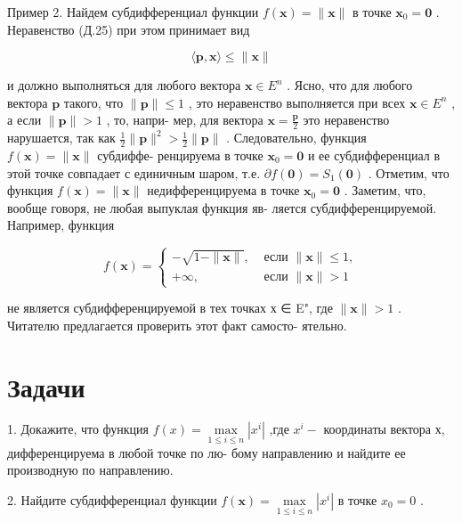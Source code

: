\documentclass[8pt]{extarticle}
\begin{document}
Пример 2. Найдем субдифференциал функции \(f\left( \mathbf{x}\right)  = \parallel \mathbf{x}\parallel\) в точке \({\mathbf{x}}_{0} = \mathbf{0}\) . Неравенство (Д.25) при этом принимает вид

\[
\langle \mathbf{p},\mathbf{x}\rangle  \leq  \parallel \mathbf{x}\parallel
\]

и должно выполняться для любого вектора \(\mathbf{x} \in  {E}^{n}\) . Ясно, что для любого вектора \(\mathbf{p}\) такого, что \(\parallel \mathbf{p}\parallel  \leq  1\) , это неравенство выполняется при всех \(\mathbf{x} \in  {E}^{n}\) , а если \(\parallel \mathbf{p}\parallel  > 1\) , то, напри- мер, для вектора \(\mathbf{x} = \frac{\mathbf{p}}{2}\) это неравенство нарушается, так как \(\frac{1}{2}\parallel \mathbf{p}{\parallel }^{2} > \frac{1}{2}\parallel \mathbf{p}\parallel\) . Следовательно, функция \(f\left( \mathbf{x}\right)  = \parallel \mathbf{x}\parallel\) субдиффе- ренцируема в точке \({\mathbf{x}}_{0} = \mathbf{0}\) и ее субдифференциал в этой точке совпадает с единичным шаром, т.е. \(\partial f\left( \mathbf{0}\right)  = {S}_{1}\left( \mathbf{0}\right)\) . Отметим, что функция \(f\left( \mathbf{x}\right)  = \parallel \mathbf{x}\parallel\) недифференцируема в точке \({\mathbf{x}}_{0} = \mathbf{0}\) . Заметим, что, вообще говоря, не любая выпуклая функция яв- ляется субдифференцируемой. Например, функция

\[
f\left( \mathbf{x}\right)  = \left\{  \begin{array}{ll}  - \sqrt{1 - \parallel \mathbf{x}\parallel }, & \text{ если }\parallel \mathbf{x}\parallel  \leq  1, \\   + \infty , & \text{ если }\parallel \mathbf{x}\parallel  > 1 \end{array}\right.
\]

не является субдифференцируемой в тех точках х ∈ E", где \(\parallel \mathbf{x}\parallel  > 1\) . Читателю предлагается проверить этот факт самосто- ятельно.

\section*{Задачи}

1. Докажите, что функция \(f\left( x\right)  = \mathop{\max }\limits_{{1 \leq  i \leq  n}}\left| {x}^{i}\right|\) ,где \({x}^{i} -\) координаты вектора х, дифференцируема в любой точке по лю- бому направлению и найдите ее производную по направлению.

2. Найдите субдифференциал функции \(f\left( \mathbf{x}\right)  = \mathop{\max }\limits_{{1 \leq  i \leq  n}}\left| {x}^{i}\right|\) в точке \({x}_{0} = 0\) .
\end{document}
